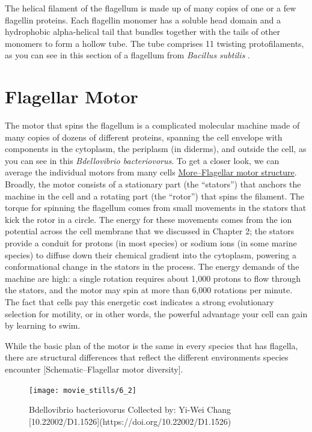 \documentclass[]{tufte-book}
\begin{document}
The helical filament of the flagellum is made up of many copies of one
or a few flagellin proteins. Each flagellin monomer has a soluble head
domain and a hydrophobic alpha-helical tail that bundles together with
the tails of other monomers to form a hollow tube. The tube comprises 11
twisting protofilaments, as you can see in this section of a flagellum
from \emph{Bacillus subtilis} \citet{wang2017}.

\section{Flagellar Motor}\label{flagellar-motor}

The motor that spins the flagellum is a complicated molecular machine
made of many copies of dozens of different proteins, spanning the cell
envelope with components in the cytoplasm, the periplasm (in diderms),
and outside the cell, as you can see in this \emph{Bdellovibrio
bacteriovorus}. To get a closer look, we can average the individual
motors from many cells
\protect\hyperlink{moreflagellar-motor-structure}{More--Flagellar motor
structure}. Broadly, the motor consists of a stationary part (the
``stators'') that anchors the machine in the cell and a rotating part
(the ``rotor'') that spins the filament. The torque for spinning the
flagellum comes from small movements in the stators that kick the rotor
in a circle. The energy for these movements comes from the ion potential
across the cell membrane that we discussed in Chapter 2; the stators
provide a conduit for protons (in most species) or sodium ions (in some
marine species) to diffuse down their chemical gradient into the
cytoplasm, powering a conformational change in the stators in the
process. The energy demands of the machine are high: a single rotation
requires about 1,000 protons to flow through the stators, and the motor
may spin at more than 6,000 rotations per minute. The fact that cells
pay this energetic cost indicates a strong evolutionary selection for
motility, or in other words, the powerful advantage your cell can gain
by learning to swim.

While the basic plan of the motor is the same in every species that has
flagella, there are structural differences that reflect the different
environments species encounter {[}Schematic--Flagellar motor
diversity{]}.

\begin{figure}
\texttt{[image: movie\_stills/6\_2]} \caption[Bdellovibrio bacteriovorus Collected by]{Bdellovibrio bacteriovorus Collected by: Yi-Wei Chang [10.22002/D1.1526](https://doi.org/10.22002/D1.1526)}\label{fig:unnamed-chunk-101}
\end{figure}
\end{document}

